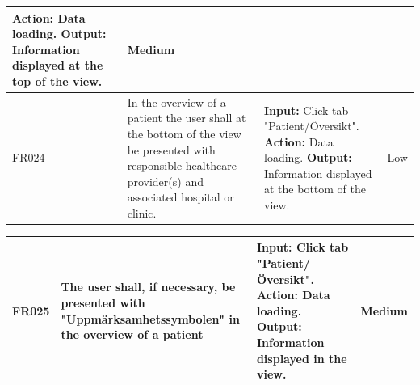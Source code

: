 \documentclass{scrreprt}
\begin{document}
\begin{center}
\begin{tabularx}{\linewidth}{| l | X | X | l |}
\newline \textbf{Action:} Data loading.
\newline \textbf{Output:} Information displayed at the top of the view. & Medium \\ 
\hline
FR024 & In the overview of a patient the user shall at the bottom of the view be presented with responsible healthcare provider(s) and associated hospital or clinic.  & \textbf{Input:} Click tab "Patient/Översikt".
\newline \textbf{Action:} Data loading.
\newline \textbf{Output:} Information displayed at the bottom of the view.  & Low \\
\hline
\end{tabularx}
\begin{tabularx}{\linewidth}{| l | X | X | l |}
\hline
FR025 & The user shall, if necessary, be presented with "Uppmärksamhetssymbolen" in the overview of a patient & \textbf{Input:} Click tab "Patient/Översikt".
\newline \textbf{Action:} Data loading.
\newline \textbf{Output:} Information displayed in the view. & Medium \\ 
\hline
\end{tabularx}
\end{center}
\end{document}
